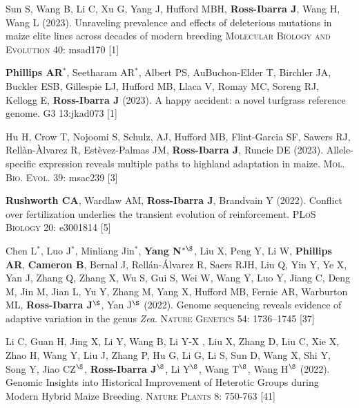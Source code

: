 \documentclass[letterpaper,10pt]{article}
\begin{document}
\begin{etaremune}
\item Sun S, Wang B, Li C, Xu G, Yang J, Hufford MBH, \textbf{Ross-Ibarra J}, Wang H, Wang L (2023). Unraveling prevalence and effects of deleterious mutations in maize elite lines across decades of modern breeding \textsc{Molecular Biology and Evolution} 40: msad170
 [1]\\

\item \textbf{Phillips AR}$^*$, Seetharam AR$^*$, Albert PS, AuBuchon-Elder T, Birchler JA, Buckler ESB,    Gillespie LJ, Hufford MB,    Llaca V,  Romay MC,  Soreng RJ, Kellogg E, \textbf{Ross-Ibarra J} (2023). A happy accident: a novel turfgrass reference genome. \textsc{G3} 13:jkad073
 [1]\\

\item Hu H, Crow T, Nojoomi S, Schulz, AJ, Hufford MB, Flint-Garcia SF, Sawers RJ, Rell\`{a}n-\`{A}lvarez R, Est\`{e}vez-Palmas JM, \textbf{Ross-Ibarra J}, Runcie DE (2023). Allele-specific expression reveals multiple paths to highland adaptation in maize. \textsc{Mol. Bio. Evol.} 39: msac239
 [3]\\

\item \textbf{Rushworth CA}, Wardlaw AM, \textbf{Ross-Ibarra J}, Brandvain Y (2022). Conflict over fertilization underlies the transient evolution of reinforcement. \textsc{PLoS Biology} 20: e3001814 %
 [5]\\

\item Chen L$^*$, Luo J$^*$, Minliang Jin$^*$, \textbf{Yang N$^{*\S}$}, Liu X, Peng Y, Li W, \textbf{Phillips AR}, \textbf{Cameron B}, Bernal J, Rell\'{a}n-\'{A}lvarez R, Saers RJH, Liu Q, Yin Y, Ye X, Yan J, Zhang Q, Zhang X, Wu S, Gui S, Wei W, Wang Y, Luo Y, Jiang C, Deng M, Jin M, Jian L, Yu Y, Zhang M, Yang X, Hufford MB, Fernie AR, Warburton ML, \textbf{Ross-Ibarra J$^\S$}, Yan J$^\S$ (2022). Genome sequencing reveals evidence of adaptive variation in the genus \textit{Zea}. \textsc{Nature Genetics} 54: 1736–1745
 [37]\\

\item Li C, Guan H, Jing X, Li Y, Wang B, Li Y-X , Liu X, Zhang D, Liu C, Xie X, Zhao H, Wang Y, Liu J, Zhang P, Hu G, Li G, Li S, Sun D, Wang X, Shi Y, Song Y, Jiao CZ$^\S$, \textbf{Ross-Ibarra J}$^\S$, Li Y$^\S$, Wang T$^\S$, Wang H$^\S$ (2022). Genomic Insights into Historical Improvement of Heterotic Groups during Modern Hybrid Maize Breeding. \textsc{Nature Plants} 8: 750-763
 [41]\\


\end{etaremune}
\end{document}

